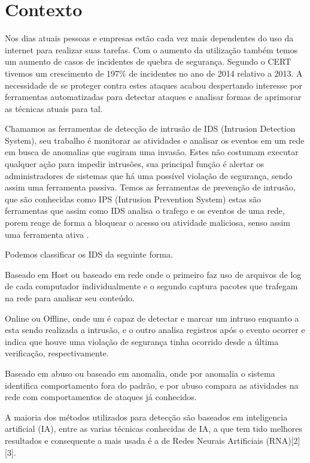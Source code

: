 \documentclass[
	12pt,				%
	openright,			%
	oneside,
	a4paper,			%
	english,			%
	french,				%
	spanish,			%
	brazil				%
	]{abntex2}
\begin{document}
\section{Contexto}

Nos dias atuais pessoas e empresas estão cada vez mais dependentes do uso da internet para realizar suas tarefas. Com o aumento da utilização também temos um aumento de casos de incidentes de quebra de segurança. Segundo o CERT \cite{CERT} tivemos um crescimento de 197\% de incidentes no ano de 2014 relativo a 2013. A necessidade de se proteger contra estes
ataques acabou despertando interesse por ferramentas automatizadas para detectar ataques e analisar formas de aprimorar as técnicas atuais para tal.

Chamamos as ferramentas de detecção de intrusão de IDS (Intrusion Detection System), seu trabalho é monitorar as atividades e analisar os eventos em um rede em busca de anomalias que sugiram uma invasão. Estes não costumam executar qualquer ação para impedir intrusões, sua principal função é alertar os administradores de sistemas que há uma possível violação de segurança, sendo assim uma ferramenta passiva.
Temos as ferramentas de prevenção de intrusão, que são conhecidas como IPS (Intrusion Prevention System) estas são ferramentas que assim como IDS analisa o trafego e os eventos de uma rede, porem reage de forma a bloquear o acesso ou atividade maliciosa, senso assim uma ferramenta ativa .

Podemos classificar os IDS da seguinte forma. 

Baseado em Host ou baseado em rede onde o primeiro faz uso de arquivos de log de cada computador individualmente e o segundo captura pacotes que trafegam na rede para analisar seu conteúdo.

Online ou Offline, onde um é capaz de detectar e marcar um intruso enquanto a esta sendo realizada a intrusão, e o outro analisa registros após o evento ocorrer e indica que houve uma violação de segurança tinha ocorrido desde a última verificação, respectivamente.

Baseado em abuso ou baseado em anomalia, onde por anomalia o sistema identifica comportamento fora do padrão, e por abuso compara as atividades na rede com comportamentos de ataques já conhecidos.

A maioria dos métodos utilizados para detecção são baseados em inteligencia artificial (IA), entre as varias técnicas conhecidas de IA, a que tem tido melhores resultados e consequente a mais usada é a de Redes Neurais Artificiais (RNA)[2][3].
\end{document}
